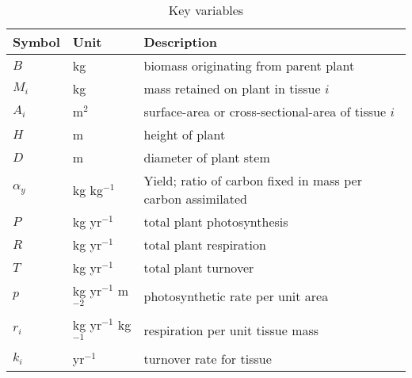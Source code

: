 \documentclass[a4paper,11pt]{article}
\begin{document}
\newpage

\begin{table}[ht]
 \caption{Key variables}
\centering

{\footnotesize  %
  \begin{tabular}{p{2cm}p{2cm}p{7cm}}
  \hline
  Symbol & Unit & Description \\
  \hline

  $B$   & kg  & biomass originating from parent plant\\
  $M_i$ & kg  & mass retained on plant in tissue $i$\\
  $A_i$ & m$^2$  & surface-area or cross-sectional-area of tissue $i$\\
  $H$   & m  & height of plant\\
  $D$   & m  & diameter of plant stem\\
  $\alpha_y$ & kg kg$^{-1}$ & Yield; ratio of carbon fixed in mass per carbon assimilated \\
  $P$ & kg yr$^{-1}$ & total plant photosynthesis \\
  $R$ & kg yr$^{-1}$ & total plant respiration \\
  $T$ & kg yr$^{-1}$ & total plant turnover \\
  $p$ & kg yr$^{-1}$ m$^{-2}$  & photosynthetic rate per unit area \\
  $r_i$ & kg yr$^{-1}$ kg$^{-1}$  & respiration per unit tissue mass \\
  $k_i$ & yr$^{-1}$ & turnover rate for tissue \\
  \hline
  \end{tabular}
}
\label{tab:definitions}
\end{table}

\newpage
\end{document}
